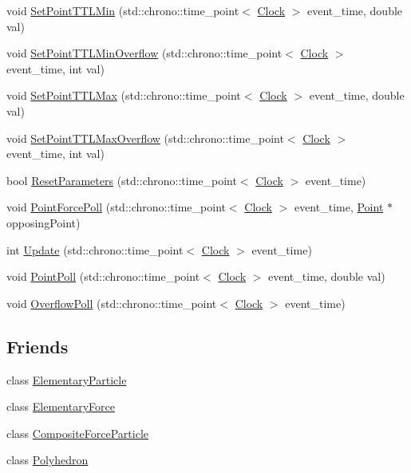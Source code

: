\begin{DoxyCompactItemize}
void \hyperlink{class_point_ae36f75ff4e27742000acd8cad7743614}{Set\+Point\+T\+T\+L\+Min} (std\+::chrono\+::time\+\_\+point$<$ \hyperlink{universe_8h_a0ef8d951d1ca5ab3cfaf7ab4c7a6fd80}{Clock} $>$ event\+\_\+time, double val)
\item 
void \hyperlink{class_point_a167884648fa6ce217472edfdbf515ac3}{Set\+Point\+T\+T\+L\+Min\+Overflow} (std\+::chrono\+::time\+\_\+point$<$ \hyperlink{universe_8h_a0ef8d951d1ca5ab3cfaf7ab4c7a6fd80}{Clock} $>$ event\+\_\+time, int val)
\item 
void \hyperlink{class_point_a1227b110f1fa0aab599f9374ea5ec484}{Set\+Point\+T\+T\+L\+Max} (std\+::chrono\+::time\+\_\+point$<$ \hyperlink{universe_8h_a0ef8d951d1ca5ab3cfaf7ab4c7a6fd80}{Clock} $>$ event\+\_\+time, double val)
\item 
void \hyperlink{class_point_a6a7ca43c551232d5c5d0f5a5d8603c9e}{Set\+Point\+T\+T\+L\+Max\+Overflow} (std\+::chrono\+::time\+\_\+point$<$ \hyperlink{universe_8h_a0ef8d951d1ca5ab3cfaf7ab4c7a6fd80}{Clock} $>$ event\+\_\+time, int val)
\item 
bool \hyperlink{class_point_a123c78bef71f74d71bc833709a38709c}{Reset\+Parameters} (std\+::chrono\+::time\+\_\+point$<$ \hyperlink{universe_8h_a0ef8d951d1ca5ab3cfaf7ab4c7a6fd80}{Clock} $>$ event\+\_\+time)
\item 
void \hyperlink{class_point_a414f2215f758cd69fa67e8135ecc4fe2}{Point\+Force\+Poll} (std\+::chrono\+::time\+\_\+point$<$ \hyperlink{universe_8h_a0ef8d951d1ca5ab3cfaf7ab4c7a6fd80}{Clock} $>$ event\+\_\+time, \hyperlink{class_point}{Point} $\ast$opposing\+Point)
\item 
int \hyperlink{class_point_a7ad2d1933410012c59bffbd4ac611279}{Update} (std\+::chrono\+::time\+\_\+point$<$ \hyperlink{universe_8h_a0ef8d951d1ca5ab3cfaf7ab4c7a6fd80}{Clock} $>$ event\+\_\+time)
\item 
void \hyperlink{class_point_a026fcbc22b4667e74fea48a9dc6eeb61}{Point\+Poll} (std\+::chrono\+::time\+\_\+point$<$ \hyperlink{universe_8h_a0ef8d951d1ca5ab3cfaf7ab4c7a6fd80}{Clock} $>$ event\+\_\+time, double val)
\item 
void \hyperlink{class_point_a44c69c43cfdcb3273d0e6786a21fd000}{Overflow\+Poll} (std\+::chrono\+::time\+\_\+point$<$ \hyperlink{universe_8h_a0ef8d951d1ca5ab3cfaf7ab4c7a6fd80}{Clock} $>$ event\+\_\+time)
\end{DoxyCompactItemize}
\subsection*{Friends}
\begin{DoxyCompactItemize}
\item 
class \hyperlink{class_point_af2ace341c1d7ccd30de3502502773591}{Elementary\+Particle}
\item 
class \hyperlink{class_point_a6e57500586e9cd366f5cf76ea0299957}{Elementary\+Force}
\item 
class \hyperlink{class_point_a9bc6eb2a4c20ce83728a7c9a31b91f19}{Composite\+Force\+Particle}
\item 
class \hyperlink{class_point_a28d1b9582890ca3e2b61dafdc1c3ba84}{Polyhedron}
\end{DoxyCompactItemize}
